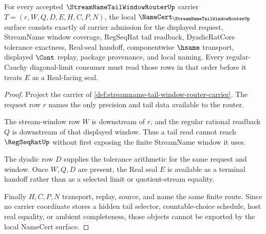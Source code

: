 \begin{theorem}\label{thm:streamname-tail-window-router-namecert-obligations}
For every accepted $\StreamNameTailWindowRouterUp$ carrier $T=(r,W,Q,D,E,H,C,P,N)$, the local $\NameCert_{\StreamNameTailWindowRouterUp}$ surface consists exactly of carrier admission for the displayed request, StreamName window coverage, RegSeqRat tail readback, DyadicRatCore tolerance exactness, Real-seal handoff, componentwise $\hsame$ transport, displayed $\Cont$ replay, package provenance, and local naming. Every regular-Cauchy diagonal-limit consumer must read those rows in that order before it treats $E$ as a Real-facing seal.
\end{theorem}
\begin{proof}
Project the carrier of \autoref{def:streamname-tail-window-router-carrier}. The request row $r$ names the only precision and tail data available to the router.

The stream-window row $W$ is downstream of $r$, and the regular rational readback $Q$ is downstream of that displayed window. Thus a tail read cannot reach $\RegSeqRatUp$ without first exposing the finite StreamName window it uses.

The dyadic row $D$ supplies the tolerance arithmetic for the same request and window. Once $W,Q,D$ are present, the Real seal $E$ is available as a terminal handoff rather than as a selected limit or quotient-stream equality.

Finally $H,C,P,N$ transport, replay, source, and name the same finite route. Since no carrier coordinate stores a hidden tail selector, countable-choice schedule, host real equality, or ambient completeness, those objects cannot be exported by the local NameCert surface.
\end{proof}



